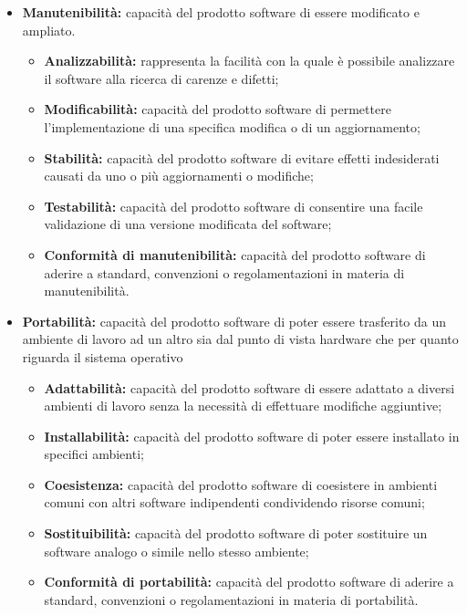 \documentclass[a4paper]{report}
\begin{document}
\begin{itemize}
					\item \textbf{Manutenibilità:} capacità del prodotto software di essere modificato e ampliato.
					\begin{itemize}
						\item \textbf{Analizzabilità:} rappresenta la facilità con la quale è possibile analizzare il software alla
						ricerca di carenze e difetti;
						\item \textbf{Modificabilità:} capacità del prodotto software di permettere l'implementazione di una
						specifica modifica o di un aggiornamento;
						\item \textbf{Stabilità:} capacità del prodotto software di evitare effetti indesiderati causati da uno o
						più aggiornamenti o modifiche;
						\item \textbf{Testabilità:} capacità del prodotto software di consentire una facile validazione di una
						versione modificata del software;
						\item \textbf{Conformità di manutenibilità:} capacità del prodotto software di aderire a standard,
						convenzioni o regolamentazioni in materia di manutenibilità.
					\end{itemize}										
					
					\item \textbf{Portabilità:} capacità del prodotto software di poter essere trasferito da un ambiente di lavoro
					ad un altro sia dal punto di vista hardware che per quanto riguarda il sistema operativo
					\begin{itemize}
						\item \textbf{Adattabilità:} capacità del prodotto software di essere adattato a diversi ambienti di
						lavoro senza la necessità di effettuare modifiche aggiuntive;
						\item \textbf{Installabilità:} capacità del prodotto software di poter essere installato in specifici
						ambienti;
						\item \textbf{Coesistenza:} capacità del prodotto software di coesistere in ambienti comuni con altri
						software indipendenti condividendo risorse comuni;
						\item \textbf{Sostituibilità:} capacità del prodotto software di poter sostituire un software analogo o
						simile nello stesso ambiente;
						\item \textbf{Conformità di portabilità:} capacità del prodotto software di aderire a standard,
						convenzioni o regolamentazioni in materia di portabilità.
					\end{itemize}										
					
				\end{itemize}
				
\end{document}
